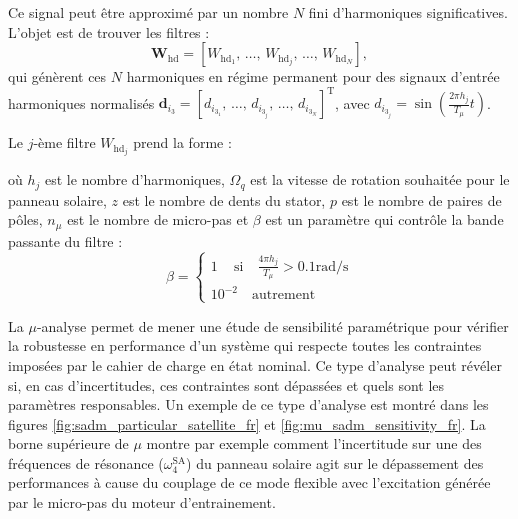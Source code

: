 Ce signal peut être approximé par un nombre $N$ fini d’harmoniques significatives. L’objet est de trouver les filtres :
\begin{equation}
\mathbf{W}_{\mathrm{hd}} = \left[W_{\mathrm{hd}_1},\,\dots,\,W_{\mathrm{hd}_j},\,\dots,\,W_{\mathrm{hd}_N}\right],
\end{equation}
qui génèrent ces $N$ harmoniques en régime permanent pour des signaux d'entrée harmoniques normalisés $\mathbf{d}_{i_3}=\left[{d}_{i_{3_1}},\,\dots,\,{d}_{i_{3_j}},\,\dots,\,{d}_{i_{3_N}}\right]^{\mathrm{T}}$, avec ${d}_{i_{3_j}} = \sin\left(\frac{2\pi h_j}{T_\mu} t\right)$.

Le $j$-ème filtre $W_{\mathrm{hd}_j}$ prend la forme :

\begin{centering}
\end{centering}

où $h_j$ est le nombre d’harmoniques, $\Omega_q$ est la vitesse de rotation souhaitée pour le panneau solaire, $z$ est le nombre de dents du stator, $p$ est le nombre de paires de pôles, $n_\mu$ est le nombre de micro-pas et $\beta$ est un paramètre qui contrôle la bande passante du filtre :
\begin{equation}
\beta = \left\{ \begin{array}{l}
	1\,\quad \mathrm{si}\quad \frac{4\pi h_j}{T_\mu}>0.1\mathrm{rad/s} \\
	10^{-2}\quad\mathrm{autrement}
\end{array}\right.
\end{equation}

La $\mu$-analyse permet de mener une étude de sensibilité paramétrique pour vérifier la robustesse en performance d’un système qui respecte toutes les contraintes imposées par le cahier de charge en état nominal. Ce type d’analyse peut révéler si, en cas d’incertitudes, ces contraintes sont dépassées et quels sont les paramètres responsables. Un exemple de ce type d’analyse est montré dans les figures \ref{fig:sadm_particular_satellite_fr} et \ref{fig:mu_sadm_sensitivity_fr}. La borne supérieure de $\mu$ montre par exemple comment l’incertitude sur une des fréquences de résonance ($\omega_4^{\mathrm{SA}}$) du panneau solaire agit sur le dépassement des performances à cause du couplage de ce mode flexible avec l’excitation générée par le micro-pas du moteur d’entrainement. 

